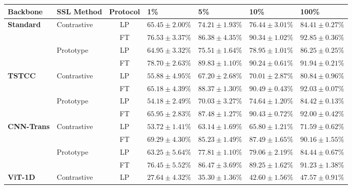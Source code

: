 \begin{table}[H]
\centering
\small
\renewcommand{\arraystretch}{1.15}
\begin{tabularx}{\textwidth}{llcXXXX}
\toprule
\textbf{Backbone} & \textbf{SSL Method} & \textbf{Protocol} & \textbf{1\%} & \textbf{5\%} & \textbf{10\%} & \textbf{100\%} \\
\midrule
\multirow{4}{*}{\textbf{Standard}} 
  & \multirow{2}{*}{Contrastive} & LP & $65.45 \pm 2.00\%$ & $74.21 \pm 1.93\%$ & $76.44 \pm 3.01\%$ & $84.41 \pm 0.27\%$ \\
  &                              & FT & $76.53 \pm 3.37\%$ & $86.38 \pm 4.35\%$ & $90.34 \pm 1.02\%$ & $92.85 \pm 0.36\%$ \\
  \cmidrule(lr){2-7}
  & \multirow{2}{*}{Prototype}   & LP & $64.95 \pm 3.32\%$ & $75.51 \pm 1.64\%$ & $78.95 \pm 1.01\%$ & $86.25 \pm 0.25\%$ \\
  &                              & FT & $78.70 \pm 2.63\%$ & $89.83 \pm 1.10\%$ & $90.24 \pm 0.61\%$ & $91.94 \pm 0.21\%$ \\
\midrule
\multirow{4}{*}{\textbf{TSTCC}} 
  & \multirow{2}{*}{Contrastive} & LP & $55.88 \pm 4.95\%$ & $67.20 \pm 2.68\%$ & $70.01 \pm 2.87\%$ & $80.84 \pm 0.96\%$ \\
  &                              & FT & $65.18 \pm 4.39\%$ & $88.37 \pm 1.30\%$ & $90.49 \pm 0.43\%$ & $92.03 \pm 0.07\%$ \\
  \cmidrule(lr){2-7}
  & \multirow{2}{*}{Prototype}   & LP & $54.18 \pm 2.49\%$ & $70.03 \pm 3.27\%$ & $74.64 \pm 1.20\%$ & $84.42 \pm 0.13\%$ \\
  &                              & FT & $65.95 \pm 2.83\%$ & $87.48 \pm 1.27\%$ & $90.43 \pm 0.72\%$ & $92.00 \pm 0.42\%$ \\
\midrule
\multirow{4}{*}{\textbf{CNN-Trans}} 
  & \multirow{2}{*}{Contrastive} & LP & $53.72 \pm 1.41\%$ & $63.14 \pm 1.69\%$ & $65.80 \pm 1.21\%$ & $71.59 \pm 0.62\%$ \\
  &                              & FT & $69.29 \pm 4.30\%$ & $85.23 \pm 1.49\%$ & $87.49 \pm 1.65\%$ & $90.16 \pm 1.55\%$ \\
  \cmidrule(lr){2-7}
  & \multirow{2}{*}{Prototype}   & LP & $63.25 \pm 5.64\%$ & $77.81 \pm 1.10\%$ & $79.06 \pm 2.19\%$ & $84.44 \pm 0.67\%$ \\
  &                              & FT & $76.45 \pm 5.52\%$ & $86.47 \pm 3.69\%$ & $89.25 \pm 1.62\%$ & $91.23 \pm 1.38\%$ \\
\midrule
\multirow{4}{*}{\textbf{ViT-1D}} 
  & \multirow{2}{*}{Contrastive} & LP & $27.64 \pm 4.32\%$ & $35.30 \pm 1.36\%$ & $42.60 \pm 1.56\%$ & $47.57 \pm 0.91\%$ \\

\end{tabularx}
\end{table}
